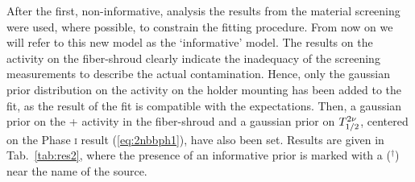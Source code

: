  After the first, non-informative, analysis the results from the material screening were used, where possible, to constrain the fitting procedure. From now on we will refer to this new model as the `informative' model. The results on the  activity on the fiber-shroud clearly indicate the inadequacy of the screening measurements to describe the actual contamination. Hence, only the gaussian prior distribution on the  activity on the holder mounting has been added to the fit, as the result of the fit is compatible with the expectations. Then, a gaussian prior on the  +  activity in the fiber-shroud and a gaussian prior on $T_{1/2}^{2\nu}$, centered on the {\gerda} Phase \textsc{i} result (\ref{eq:2nbbph1}), have also been set. Results are given in Tab.~\ref{tab:res2}, where the presence of an informative prior is marked with a ($^{\dagger}$) near the name of the source.

